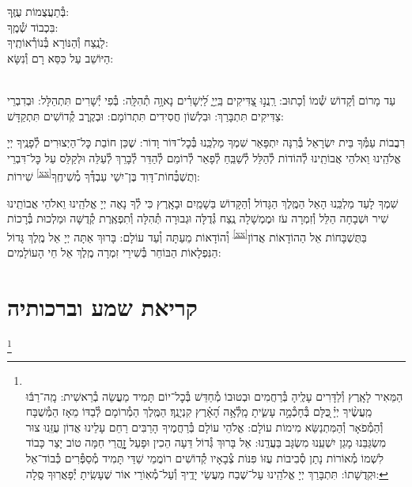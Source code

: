 \documentclass[twoside, openany, parskip=half, 11pt]{book}
\begin{document}

בְּ֯תַעֲצֻמוֹת עֻזֶּֽךָ:\\
בִּכְבוֹד שְׁ֯מֶֽךָ:\\
לָנֶֽצַח וְ֯הַנּוֹרָא בְּ֯נוֹרְ֯אוֹתֶֽיךָ:\\
הַיּוֹשֵׁב עַל כִּסֵּא רָם וְ֯נִשָּׂא:

\\
עַד מָרוֹם וְ֯קָדוֹשׁ שְׁ֯מוֹ וְ֯כָתוּב: רַֽנֲנ֣וּ צַ֭דִּיקִים בַּֽיְיָ֑ לַ֝יְשָׁרִ֗ים נָאוָ֥ה תְ֯הִלָּֽה: בְּ֯פִי יְ֯שָׁרִים תִּתְהַלָּל: וּבְדִבְרֵי צַדִּיקִים תִּתְבָּרַךְ: וּבִלְשׁוֹן חֲסִידִים תִּתְרוֹמָם: וּבְקֶֽרֶב קְ֯דוֹשִׁים תִּתְקַדָּשׁ:

רִבֲבוֹת עַמְּ֯ךָ בֵּית יִשְׂרָאֵל בְּ֯רִנָּה יִתְפָּאַר שִׁמְךָ מַלְכֵּֽנוּ בְּ֯כׇל־דּוֹר וָדוֹר: שֶׁכֵּן חוֹבַת כׇּל־הַיְצוּרִים לְ֯פָנֶֽיךָ יְיָ אֱלֹהֵֽינוּ וֵאלֹהֵי אֲבוֹתֵֽינוּ לְ֯הוֹדוֹת לְ֯הַלֵּל לְ֯שַׁבֵּֽחַ לְ֯פָאֵר לְ֯רוֹמֵם לְ֯הַדֵּר לְ֯בָרֵךְ לְ֯עַלֵּה וּלְקַלֵּס עַל כׇּל־דִּבְרֵי שִׁירוֹת \textsuperscript{\ref{xx}}וְתֻשְׁבְּ֯חוֹת־דָּוִד בֶּן־יִשַׁי עַבְדְּ֯ךָ מְ֯שִׁיחֶֽךָ:


שִׁמְךָ לָעַד מַלְכֵּֽנוּ הָאֵל הַמֶּֽלֶךְ הַגָּדוֹל וְ֯הַקָּדוֹשׁ בַּשָׁמַֽיִם וּבָאָֽרֶץ כִּי לְ֯ךָ נָאֶה יְיָ אֱלֹהֵֽינוּ וֵאלֹהֵי אֲבוֹתֵֽינוּ שִׁיר וּשְׁבָחָה הַלֵּל וְ֯זִמְרָה עֹז וּמֶמְשָׁלָה נֶֽצַח גְּ֯דֻלָּה וּגְבוּרָה תְּ֯הִלָּה וְ֯תִפְאֶֽרֶת קְ֯דֻשָּׁה וּמַלְכוּת בְּ֯רָכוֹת וְ֯הוֹדָאוֹת מֵעַתָּה וְ֯עַד עוֹלָם:
בָּרוּךְ אַתָּה יְיָ אֵל מֶֽלֶךְ גָּדוֹל \textsuperscript{\ref{xx}}בַּתֻּשְׁבָּחוֹת אֵל הַהוֹדָאוֹת אֲדוֹן הַנִּפְלָאוֹת הַבּוֹחֵר בְּ֯שִׁירֵי זִמְרָה מֶֽלֶךְ אֵל חֵי הָעוֹלָמִים:
\mimaamakim
\halfkaddish

\section*{ קריאת שמע וברכותיה }

\barachu


\footnote{\\
הַמֵּאִיר לָאָֽרֶץ וְ֯לַדָּרִים עָלֶֽיהָ בְּ֯רַחֲמִים וּבְטוּבוֹ מְ֯חַדֵּשׁ בְּ֯כׇל־יוֹם תָּמִיד מַעֲשֵׂה בְ֯רֵאשִׁית:
מָֽה־רַבּ֬וּ מַֽעֲשֶׂ֨יךָ יְיָ֗ ֖כֻּלָּם בְּ֯חָכְ֯מָ֣ה עָשִׂ֑יתָ מָֽלְ֯אָ֥ה הָ֝אָ֗רֶץ קִנְיָנֶֽךָ׃ הַמֶּֽלֶךְ הַמְ֯רוֹמָם לְ֯בַדּוֹ מֵאָז הַמְ֯שֻׁבָּח וְ֯הַמְ֯פֹאָר וְ֯הַמִּתְנַשֵּׂא מִימוֹת עוֹלָם: אֱלֹהֵי עוֹלָם בְּ֯רַחֲמֶיךָ הָרַבִּים רַחֵם עָלֵינוּ אֲדוֹן עֻזֵּֽנוּ צוּר מִשְׂגַּבֵּנוּ מָגֵן יִשְׁעֵֽנוּ מִשְׂגָּב בַּעֲדֵֽנוּ: אֵל בָּרוּךְ גְּ֯דוֹל דֵּעָה הֵכִין וּפָעַל זׇׇׇׇׇהֳרֵי חַמָּה טוֹב יָצַר כָּבוֹד לִשְׁמוֹ מְ֯אוֹרוֹת נָתַן סְ֯בִיבוֹת עֻזּוֹ פִּנּוֹת צְ֯בָאָיו קְ֯דוֹשִׁים רוֹמֲמֵי שַׁדַּי תָּמִיד מְ֯סַפְּ֯רִים כְּ֯בוֹד־אֵל וּקְדֻשָׁתוֹ: תִּתְבָּרַךְ יְיָ אֱלֹהֵֽינוּ עַל־שֶׁבַח מַעֲשֵׂי יָדֶֽיךָ וְ֯עַל־מְ֯אֽוֹרֵי אוֹר שֶׁעָשִֽׂיתָ יְ֯פָאֲרֽוּךָ סֶּֽלָה:
}
\end{document}
